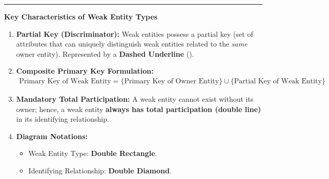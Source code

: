 \documentclass[11pt,a4paper]{article}
\newcommand{\concept}[1]{%
  \vspace{3pt}\noindent\textcolor{AnthGreen}{\rule{3.5pt}{10pt}}\enspace
  \textbf{\sffamily\color{AnthDark}#1}\par\vspace{2pt}%
}
\begin{document}
\concept{Key Characteristics of Weak Entity Types}
\begin{enumerate}
  \item \textbf{Partial Key (Discriminator):} Weak entities possess a partial key (set of attributes that can uniquely distinguish weak entities related to the \emph{same} owner entity). Represented by a \textbf{Dashed Underline} ().
  \item \textbf{Composite Primary Key Formulation:}
    \begin{align}
      \text{Primary Key of Weak Entity} = \{ \text{Primary Key of Owner Entity} \} \cup \{ \text{Partial Key of Weak Entity} \}
    \end{align}
  \item \textbf{Mandatory Total Participation:} A weak entity cannot exist without its owner; hence, a weak entity \textbf{always has total participation (double line)} in its identifying relationship.
  \item \textbf{Diagram Notations:}
    \begin{itemize}
      \item Weak Entity Type: \textbf{Double Rectangle}.
      \item Identifying Relationship: \textbf{Double Diamond}.
    \end{itemize}
\end{enumerate}
\end{document}

